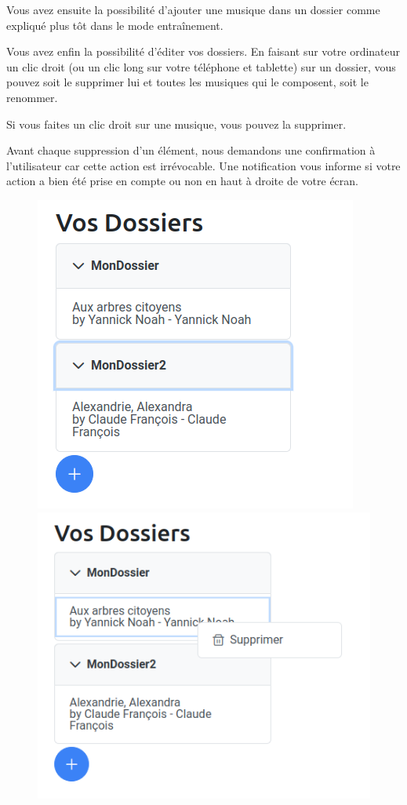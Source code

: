 \documentclass[12pt,french]{article}
\begin{document}
Vous avez ensuite la possibilité d'ajouter une musique dans un dossier comme expliqué plus tôt dans le mode entraînement.

Vous avez enfin la possibilité d'éditer vos dossiers. En faisant sur votre ordinateur un clic droit (ou un clic long sur votre téléphone et tablette) sur un dossier, vous pouvez soit le supprimer lui et toutes les musiques qui le composent, soit le renommer.

Si vous faites un clic droit sur une musique, vous pouvez la supprimer.

Avant chaque suppression d'un élément, nous demandons une confirmation à l'utilisateur car cette action est irrévocable. Une notification vous informe si votre action a bien été prise en compte ou non en haut à droite de votre écran.


\begin{figure}[H]
	\centering
	\begin{minipage}{.3\textwidth}
		\centering
		\includegraphics[scale=0.4]{dossier3.png}
	\end{minipage}%
	\begin{minipage}{.3\textwidth}
		\centering
		\includegraphics[scale=0.4]{dossier4.png}

\end{minipage}
\end{figure}
\end{document}
